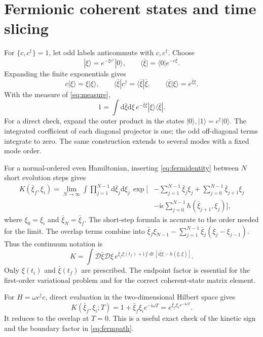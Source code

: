 \documentclass[11pt]{article}
\newcommand{\dd}{\mathrm d}
\newcommand{\ii}{\mathrm i}
\newcommand{\D}{\mathcal D}
\newcommand{\module}[1]{\clearpage\section{#1}}
\begin{document}
\module{Fermionic coherent states and time slicing}
For \(\{c,c^\dagger\}=1\), let odd labels anticommute with \(c,c^\dagger\).
Choose
\begin{equation}
 |\xi\rangle=e^{-\xi c^\dagger}|0\rangle,\qquad
 \langle\bar\xi|=\langle0|e^{-c\bar\xi}.
\end{equation}
Expanding the finite exponentials gives
\begin{equation}
 c|\xi\rangle=\xi|\xi\rangle,\qquad
 \langle\bar\xi|c^\dagger=\langle\bar\xi|\bar\xi,
 \qquad \langle\bar\xi|\xi\rangle=e^{\bar\xi\xi}.
\end{equation}
With the measure of \eqref{eq:measure},
\begin{equation}
 1=\int\dd\bar\xi\dd\xi\,e^{-\bar\xi\xi}
 |\xi\rangle\langle\bar\xi|.                         \label{eq:fermidentity}
\end{equation}
For a direct check, expand the outer product in the states
\(|0\rangle,|1\rangle=c^\dagger|0\rangle\). The integrated coefficient
of each diagonal projector is one; the odd off-diagonal terms integrate
to zero. The same construction extends to several modes with a fixed
mode order.

For a normal-ordered even Hamiltonian, inserting \eqref{eq:fermidentity}
between \(N\) short evolution steps gives
\begin{align}
 K(\bar\xi_f,\xi_i)
 =\lim_{N\to\infty}\int\prod_{j=1}^{N-1}\dd\bar\xi_j\dd\xi_j\,
 \exp\Bigg[&-\sum_{j=1}^{N-1}\bar\xi_j\xi_j
 +\sum_{j=0}^{N-1}\bar\xi_{j+1}\xi_j\nonumber\\[-2pt]
 &-\ii\epsilon\sum_{j=0}^{N-1}h(\bar\xi_{j+1},\xi_j)\Bigg],
                                                        \label{eq:discreteferm}
\end{align}
where \(\xi_0=\xi_i\) and \(\bar\xi_N=\bar\xi_f\). The short-step
formula is accurate to the order needed for the limit. The overlap
terms combine into
\(\bar\xi_f\xi_{N-1}-\sum_{j=1}^{N-1}\bar\xi_j(\xi_j-\xi_{j-1})\).
Thus the continuum notation is
\begin{equation}
 K=\int\D\bar\xi\D\xi\,
 e^{\bar\xi_f\xi(t_f)+\ii\int\dd t\,[\ii\bar\xi\dot\xi-h(\bar\xi,\xi)]}.
                                                        \label{eq:fermpath}
\end{equation}
Only \(\xi(t_i)\) and \(\bar\xi(t_f)\) are prescribed. The endpoint
factor is essential for the first-order variational problem and for
the correct coherent-state matrix element.

For \(H=\omega c^\dagger c\), direct evaluation in the two-dimensional
Hilbert space gives
\begin{equation}
 K(\bar\xi_f,\xi_i;T)=1+\bar\xi_f\xi_i e^{-\ii\omega T}
 =e^{\bar\xi_f\xi_i e^{-\ii\omega T}}.
\end{equation}
It reduces to the overlap at \(T=0\). This is a useful exact check
of the kinetic sign and the boundary factor in \eqref{eq:fermpath}.
\end{document}

